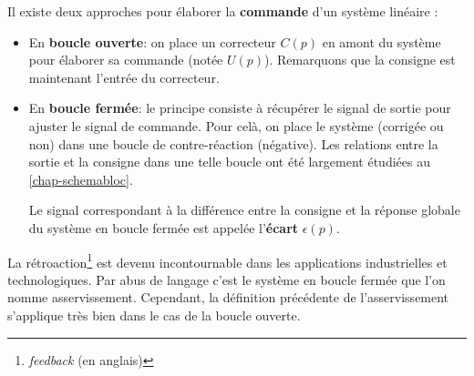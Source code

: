 Il existe deux approches pour élaborer la \textbf{commande} 
d'un système linéaire :%
\begin{itemize}
    \item En \textbf{boucle ouverte}: on place un correcteur $C(p)$
          en amont du système pour élaborer 
          sa commande (notée $U(p)$).
          Remarquons que la consigne est maintenant
          l'entrée du correcteur.
    \begin{center}
        
    \end{center}
    \item En \textbf{boucle fermée}: le principe consiste à récupérer 
          le signal de sortie pour ajuster le signal de commande. 
          Pour celà, on place le système (corrigée ou non) dans une 
          boucle de contre-réaction (négative). 
          Les relations entre la sortie et la consigne dans une telle 
          boucle ont été largement étudiées au \cref{chap-schemabloc}.
    \begin{center}
        
    \end{center}
          Le signal correspondant à la différence entre la consigne
          et la réponse globale du système en boucle fermée est
          appelée l'\textbf{écart} $\epsilon(p)$.
\end{itemize}
La rétroaction\footnote{\emph{feedback} (en anglais)} est devenu incontournable
dans les applications industrielles et technologiques. Par abus de langage 
c'est le système en boucle fermée que l'on nomme asservissement. Cependant, la 
définition précédente de l'asservissement s'applique très bien dans 
le cas de la boucle ouverte.
\clearpage
